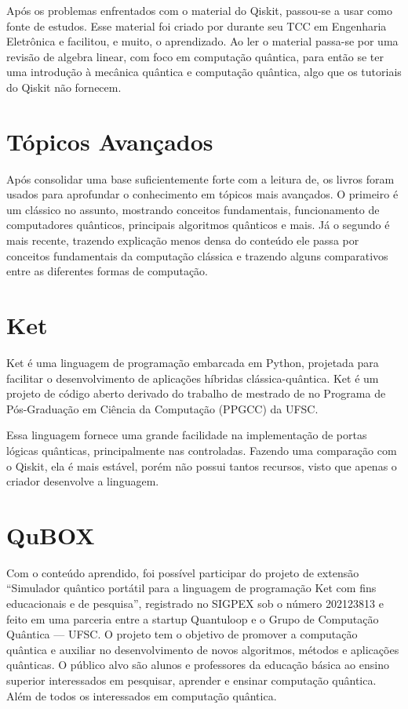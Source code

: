 Após os problemas enfrentados com o material do Qiskit, passou-se a usar\cite{giovani} como fonte de estudos.
Esse material foi criado por \citeauthor{giovani} durante seu TCC em Engenharia Eletrônica e facilitou, e muito, o aprendizado.
Ao ler o material passa-se por uma revisão de algebra linear, com foco em computação quântica, para então se ter uma introdução à mecânica quântica e computação quântica, algo que os tutoriais do Qiskit não fornecem.

\section{Tópicos Avançados}\label{sec:topicos-avancados}

Após consolidar uma base suficientemente forte com a leitura de\cite{giovani}, os livros\cite{nielsen_chuang_2010, thomas-wong} foram usados para aprofundar o conhecimento em tópicos mais avançados.
O primeiro é um clássico no assunto, mostrando conceitos fundamentais, funcionamento de computadores quânticos, principais algoritmos quânticos e mais.
Já o segundo é mais recente, trazendo explicação menos densa do conteúdo ele passa por conceitos fundamentais da computação clássica e trazendo alguns comparativos entre as diferentes formas de computação.

\section{Ket}\label{sec:ket}

Ket é uma linguagem de programação embarcada em Python, projetada para facilitar o desenvolvimento de aplicações híbridas clássica-quântica.
Ket é um projeto de código aberto derivado do trabalho de mestrado de \citeauthor{ket} no Programa de Pós-Graduação em Ciência da Computação (PPGCC) da UFSC.

Essa linguagem fornece uma grande facilidade na implementação de portas lógicas quânticas, principalmente nas controladas.
Fazendo uma comparação com o Qiskit, ela é mais estável, porém não possui tantos recursos, visto que apenas o criador desenvolve a linguagem.

\section{QuBOX}\label{sec:qubox}

Com o conteúdo aprendido, foi possível participar do projeto de extensão “Simulador quântico portátil para a linguagem de programação Ket com fins educacionais e de pesquisa”, registrado no SIGPEX sob o número 202123813 e feito em uma parceria entre a startup Quantuloop e o Grupo de Computação Quântica — UFSC.
O projeto tem o objetivo de promover a computação quântica e auxiliar no desenvolvimento de novos algoritmos, métodos e aplicações quânticas.
O público alvo são alunos e professores da educação básica ao ensino superior interessados em pesquisar, aprender e ensinar computação quântica.
Além de todos os interessados em computação quântica.

